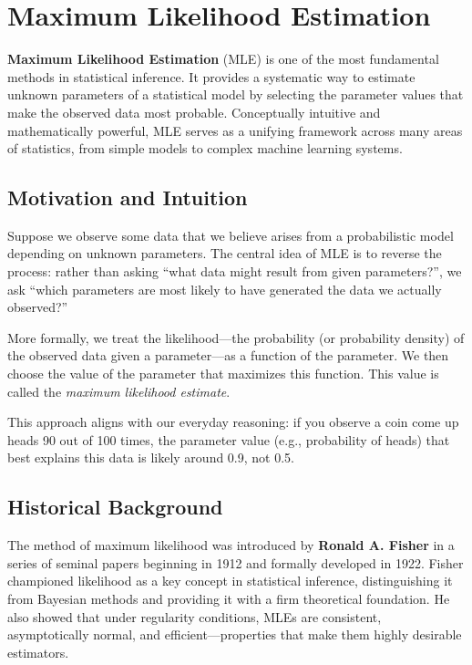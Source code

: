 \documentclass{book}
\begin{document}
\newpage

\section{Maximum Likelihood Estimation}

\textbf{Maximum Likelihood Estimation} (MLE) is one of the most fundamental methods in statistical inference. It provides a systematic way to estimate unknown parameters of a statistical model by selecting the parameter values that make the observed data most probable. Conceptually intuitive and mathematically powerful, MLE serves as a unifying framework across many areas of statistics, from simple models to complex machine learning systems.

\subsection*{Motivation and Intuition}

Suppose we observe some data that we believe arises from a probabilistic model depending on unknown parameters. The central idea of MLE is to reverse the process: rather than asking “what data might result from given parameters?”, we ask “which parameters are most likely to have generated the data we actually observed?”

More formally, we treat the likelihood—the probability (or probability density) of the observed data given a parameter—as a function of the parameter. We then choose the value of the parameter that maximizes this function. This value is called the \emph{maximum likelihood estimate}.

This approach aligns with our everyday reasoning: if you observe a coin come up heads 90 out of 100 times, the parameter value (e.g., probability of heads) that best explains this data is likely around 0.9, not 0.5.

\subsection*{Historical Background}

The method of maximum likelihood was introduced by \textbf{Ronald A. Fisher} in a series of seminal papers beginning in 1912 and formally developed in 1922. Fisher championed likelihood as a key concept in statistical inference, distinguishing it from Bayesian methods and providing it with a firm theoretical foundation. He also showed that under regularity conditions, MLEs are consistent, asymptotically normal, and efficient—properties that make them highly desirable estimators.
\end{document}
